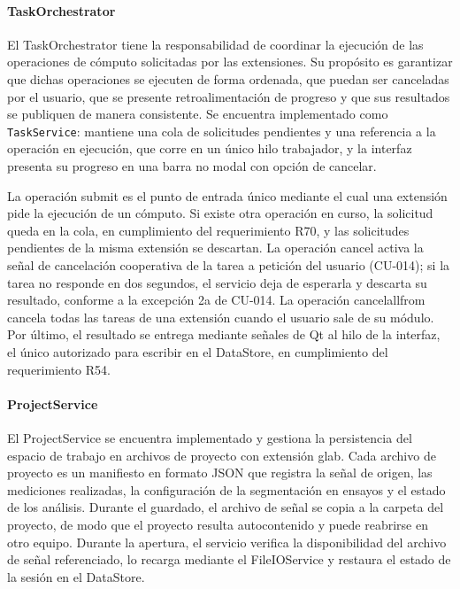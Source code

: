 \documentclass[11pt,a4paper]{article}
\DeclareRobustCommand{\_}{\textunderscore\allowbreak}
\begin{document}
\paragraph{TaskOrchestrator}
El TaskOrchestrator tiene la responsabilidad de 
coordinar la ejecución de las operaciones de cómputo solicitadas por las 
extensiones. Su propósito es garantizar que dichas operaciones se ejecuten
 de forma ordenada, que puedan ser canceladas por el usuario, que se presente 
 retroalimentación de progreso y que sus resultados se publiquen de manera
  consistente. Se encuentra implementado como \texttt{TaskService}: mantiene una cola de solicitudes pendientes y una
  referencia a la operación en ejecución, que corre en un único hilo trabajador, y la interfaz presenta su progreso en una barra no modal con opción de cancelar.

La operación submit es el punto de entrada único mediante el cual
 una extensión pide la ejecución de un cómputo. Si existe otra operación en curso, la solicitud queda en la cola, en cumplimiento del
 requerimiento R70, y las solicitudes pendientes de la misma extensión se descartan. La operación cancel activa la señal de cancelación cooperativa de la tarea a petición del usuario (CU-014); si la tarea no responde en dos segundos, el servicio deja de esperarla y descarta su resultado, conforme a la excepción 2a de CU-014. La operación cancel\_all\_from cancela todas las tareas de una extensión cuando el usuario sale de su módulo. Por último, el resultado se entrega mediante señales de Qt al hilo de la interfaz, el único autorizado para escribir en el DataStore, en cumplimiento del requerimiento R54.

\paragraph{ProjectService}
El ProjectService se encuentra implementado y gestiona la persistencia del 
espacio de trabajo en archivos de proyecto con extensión glab. Cada archivo 
de proyecto es un manifiesto en formato JSON que registra la señal de origen, 
las mediciones realizadas, la configuración de la segmentación en ensayos y 
el estado de los análisis. Durante el guardado, el archivo de señal se copia a 
la carpeta del proyecto, de modo que el proyecto resulta autocontenido y puede 
reabrirse en otro equipo. Durante la apertura, el servicio verifica 
la disponibilidad del archivo de señal referenciado, lo recarga mediante el
 FileIOService y restaura el estado de la sesión en el DataStore.
\end{document}
